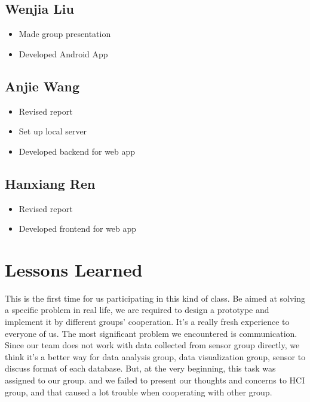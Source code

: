 \documentclass{article}
\begin{document}
\subsection{Wenjia Liu}
\begin{itemize}
	\item Made group presentation
	\item Developed Android App
\end{itemize}

\subsection{Anjie Wang}
\begin{itemize}
	\item Revised report
	\item Set up local server 
	\item Developed backend for web app
\end{itemize}

\subsection{Hanxiang Ren}
\begin{itemize}
	\item Revised report
	\item Developed frontend for web app
\end{itemize}

\section{Lessons Learned}
This is the first time for us participating in this kind of class. Be aimed at solving a specific problem in real life, we are required to design a prototype and implement it by different groups’ cooperation. It’s a really fresh experience to everyone of us. \newline
The most significant problem we encountered is communication. Since our team does not work with data collected from sensor group directly, we think it's a better way for data analysis group, data visualization group, sensor to discuss format of each database. But, at the very beginning, this task was assigned to our group. and we failed to present our thoughts and concerns to HCI group, and that caused a lot trouble when cooperating with other group.
\end{document}
